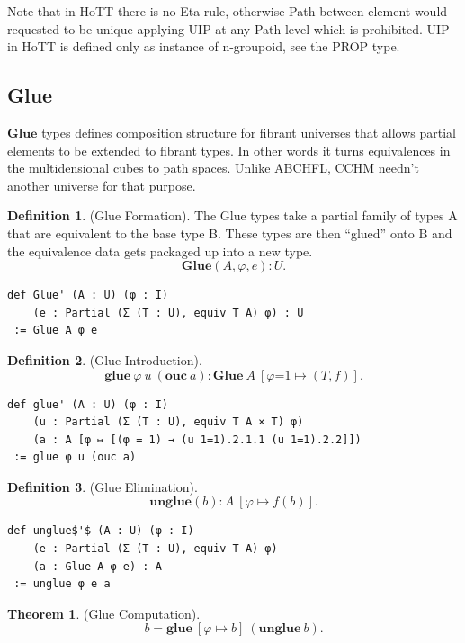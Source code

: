 \documentclass{article}
\theoremstyle{definition}
\newtheorem{definition}{Definition}
\newtheorem{theorem}{Theorem}
\begin{document}
Note that in HoTT there is no Eta rule, otherwise
Path between element would requested to be unique applying
UIP at any Path level which is prohibited. UIP in HoTT
is defined only as instance of n-groupoid, see the PROP type.


\newpage
\subsection{Glue}

$\mathbf{Glue}$ types defines composition structure for fibrant
universes that allows partial elements to be extended
to fibrant types. In other words it turns equivalences
in the multidensional cubes to path spaces.
Unlike ABCHFL, CCHM needn't another universe for that purpose.

\begin{definition} (Glue Formation).
The Glue types take a partial family of types A that are equivalent
to the base type B. These types are then “glued” onto B and the
equivalence data gets packaged up into a new type.
$$
  \mathbf{Glue}(A,\varphi,e) : U.
$$
\begin{lstlisting}[mathescape=true]
def Glue' (A : U) (φ : I)
    (e : Partial (Σ (T : U), equiv T A) φ) : U
 := Glue A φ e
\end{lstlisting}
\end{definition}

\begin{definition} (Glue Introduction).
$$
  \mathbf{glue}\ \varphi\ u\ (\mathbf{ouc}\ a) : \mathbf{Glue}\ A\ [\varphi\mbox{=}1 \mapsto (T,f)].
$$
\begin{lstlisting}[mathescape=true]
def glue' (A : U) (φ : I)
    (u : Partial (Σ (T : U), equiv T A × T) φ)
    (a : A [φ ↦ [(φ = 1) → (u 1=1).2.1.1 (u 1=1).2.2]])
 := glue φ u (ouc a)
\end{lstlisting}
\end{definition}

\begin{definition} (Glue Elimination).
$$
  \mathbf{unglue}(b) : A\ [\varphi \mapsto f(b) ].
$$
\begin{lstlisting}[mathescape=true]
def unglue$'$ (A : U) (φ : I)
    (e : Partial (Σ (T : U), equiv T A) φ)
    (a : Glue A φ e) : A
 := unglue φ e a
\end{lstlisting}
\end{definition}

\begin{theorem} (Glue Computation).
$$
  b = \mathbf{glue}\ [\varphi \mapsto b]\ (\mathbf{unglue}\ b).
$$
\end{theorem}
\end{document}
